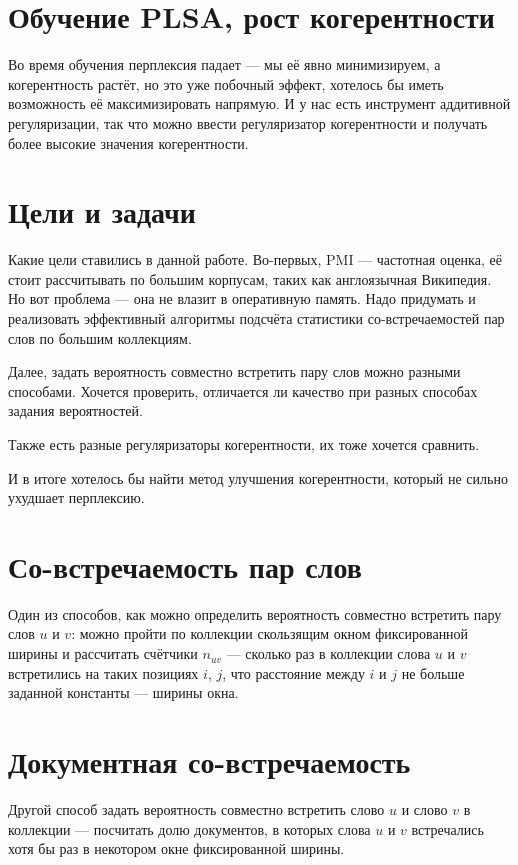 \documentclass[10pt]{extarticle}
\begin{document}
    \section{Обучение PLSA, рост когерентности}
    Во время обучения перплексия падает --- мы её явно минимизируем, а когерентность растёт, но это уже побочный эффект, хотелось бы иметь возможность её максимизировать напрямую. И у нас есть инструмент аддитивной регуляризации, так что можно ввести регуляризатор когерентности и получать более высокие значения когерентности.
    \section{Цели и задачи}
    Какие цели ставились в данной работе. Во-первых, PMI --- частотная оценка, её стоит рассчитывать по большим корпусам, таких как англоязычная Википедия. Но вот проблема --- она не влазит в оперативную память. Надо придумать и реализовать эффективный алгоритмы подсчёта статистики со-встречаемостей пар слов по большим коллекциям.

    Далее, задать вероятность совместно встретить пару слов можно разными способами. Хочется проверить, отличается ли качество при разных способах задания вероятностей.

    Также есть разные регуляризаторы когерентности, их тоже хочется сравнить.

    И в итоге хотелось бы найти метод улучшения когерентности, который не сильно ухудшает перплексию.
    \section{Со-встречаемость пар слов}
    Один из способов, как можно определить вероятность совместно встретить пару слов $u$ и $v$: можно пройти по коллекции скользящим окном фиксированной ширины и рассчитать счётчики $n_{uv}$ --- сколько раз в коллекции слова $u$ и $v$ встретились на таких позициях $i$, $j$, что расстояние между $i$ и $j$ не больше заданной константы --- ширины окна.
    \section{Документная со-встречаемость}
    Другой способ задать вероятность совместно встретить слово $u$ и слово $v$ в коллекции --- посчитать долю документов, в которых слова $u$ и $v$ встречались хотя бы раз в некотором окне фиксированной ширины.
\end{document}
